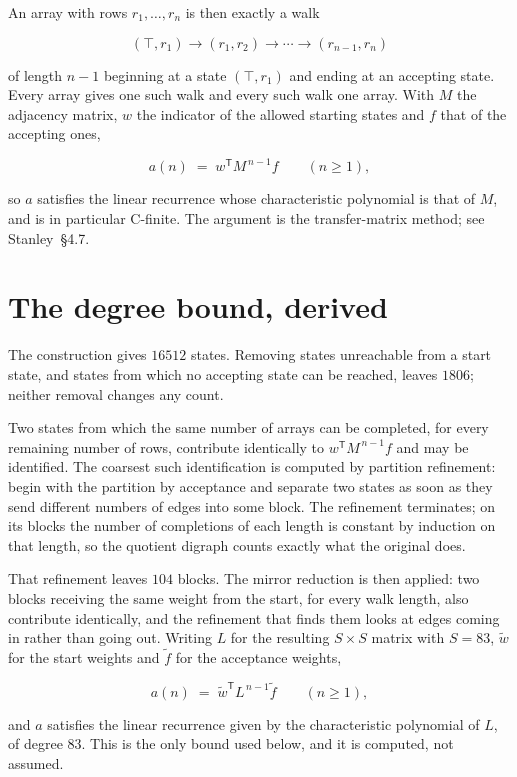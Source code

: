 \documentclass[11pt]{article}
\theoremstyle{definition}
\begin{document}
An array with rows $r_1,\dots,r_n$ is then exactly a walk

\[(\top,r_1) \to (r_1,r_2) \to \cdots \to (r_{n-1},r_n)\]

of length $n-1$ beginning at a state $(\top,r_1)$ and ending at an accepting state. Every array gives one such walk and every such walk one array. With $M$ the adjacency matrix, $w$ the indicator of the allowed starting states and $f$ that of the accepting ones,

\[a(n) \;=\; w^{\mathsf T} M^{\,n-1} f \qquad (n \ge 1),\]

so $a$ satisfies the linear recurrence whose characteristic polynomial is that of $M$, and is in particular C-finite. The argument is the transfer-matrix method; see Stanley~\S4.7.

\section{The degree bound, derived}

The construction gives $16512$ states. Removing states unreachable from a start state, and states from which no accepting state can be reached, leaves $1806$; neither removal changes any count.

Two states from which the same number of arrays can be completed, for every remaining number of rows, contribute identically to $w^{\mathsf T}M^{\,n-1}f$ and may be identified. The coarsest such identification is computed by partition refinement: begin with the partition by acceptance and separate two states as soon as they send different numbers of edges into some block. The refinement terminates; on its blocks the number of completions of each length is constant by induction on that length, so the quotient digraph counts exactly what the original does.

That refinement leaves $104$ blocks. The mirror reduction is then applied: two blocks receiving the same weight from the start, for every walk length, also contribute identically, and the refinement that finds them looks at edges coming in rather than going out. Writing $L$ for the resulting $S \times S$ matrix with $S = 83$, $\tilde w$ for the start weights and $\tilde f$ for the acceptance weights,

\[a(n) \;=\; \tilde w^{\mathsf T} L^{\,n-1} \tilde f \qquad (n \ge 1),\]

and $a$ satisfies the linear recurrence given by the characteristic polynomial of $L$, of degree $83$. This is the only bound used below, and it is computed, not assumed.
\end{document}
